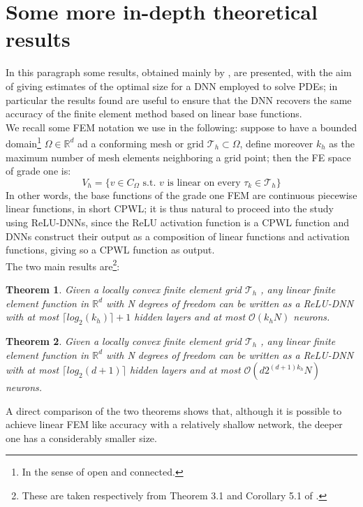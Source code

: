 \documentclass[12pt, a4paper]{report}
\theoremstyle{definition}
\newtheorem{Theorem}{Theorem}
\begin{document}
\section{Some more in-depth theoretical results}\label{section2.2}
In this paragraph some results, obtained mainly by \cite{Jinchao}, are presented, with the aim of giving estimates of the optimal size for a DNN employed to solve PDEs; in particular the results found are useful to ensure that the DNN recovers the same accuracy of the finite element method based on linear base functions.\\
We recall some FEM notation we use in the following: suppose to have a bounded domain\footnote{In the sense of open and connected.} $\Omega\in\mathbb{R}^d$ ad a conforming mesh or grid $\mathcal{T}_h\subset\Omega$, define moreover $k_h$ as the maximum number of mesh elements neighboring a grid point; then the FE space of grade one is:
\[ V_h=\{ v \in C_\Omega \text{ s.t. $v$ is linear on every } \tau_k \in \mathcal T_h \} \]
In other words, the base functions of the grade one FEM are continuous piecewise linear functions, in short CPWL; it is thus natural to proceed into the study using ReLU-DNNs, since the ReLU activation function is a CPWL function and DNNs construct their output as a composition of linear functions and activation functions, giving so a CPWL function as output.\\
\newpage \noindent The two main results are\footnote{These are taken respectively from Theorem 3.1 and Corollary 5.1 of \cite{Jinchao}.}:
\begin{Theorem}\label{thm3.1}
	\textit{Given a locally convex finite element grid $\mathcal T_h$ , any linear finite element function in $\mathbb R^d$ with N degrees of freedom can be written as a ReLU-DNN with at most $\lceil log_2 (k_h)\rceil +1$ hidden layers and at most $\mathcal O(k_hN)$ neurons.}
\end{Theorem}
\begin{Theorem}\label{corol5.1}
	\textit{Given a locally convex finite element grid $\mathcal T_h$ , any linear finite element function in $\mathbb R^d$ with N degrees of freedom can be written as a ReLU-DNN with at most $\lceil log_2 (d+1)\rceil$ hidden layers and at most $\mathcal O(d2^{(d+1)k_h}N)$ neurons.}	
\end{Theorem}
\noindent A direct comparison of the two theorems shows that, although it is possible to achieve linear FEM like accuracy with a relatively shallow network, the deeper one has a considerably smaller size.\\
\end{document}
